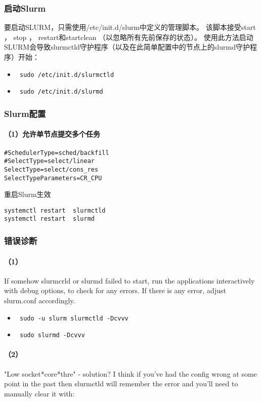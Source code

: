 {\subsubsection{启动Slurm}
要启动SLURM，只需使用/etc/init.d/slurm中定义的管理脚本。 该脚本接受start ， stop ， restart和startclean （以忽略所有先前保存的状态）。 使用此方法启动SLURM会导致slurmctld守护程序（以及在此简单配置中的节点上的slurmd守护程序）开始：
\begin{itemize}
\item \verb| sudo /etc/init.d/slurmctld|

\item \verb| sudo /etc/init.d/slurmd|
\end{itemize}



\subsubsection{Slurm配置}
\paragraph{（1）允许单节点提交多个任务}
\begin{verbatim}
#SchedulerType=sched/backfill
#SelectType=select/linear
SelectType=select/cons_res
SelectTypeParameters=CR_CPU
\end{verbatim}
重启Slurm生效
\begin{verbatim}
systemctl restart  slurmctld
systemctl restart  slurmd
\end{verbatim}


\subsubsection{错误诊断}
\paragraph{（1）}
If somehow slurmcrld or slurmd failed to start, run the applications interactively with debug options, to check for any errors. If there is any error, adjust slurm.conf accordingly.
\begin{itemize}
\item \verb| sudo -u slurm slurmctld -Dcvvv |
\item \verb| sudo slurmd -Dcvvv |
\end{itemize}

\paragraph{（2）}
"Low socket*core*thre" - solution?
I think if you've had the config wrong at some point in the past then slurmctld 
will remember the error and you'll need to manually clear it with:

}
